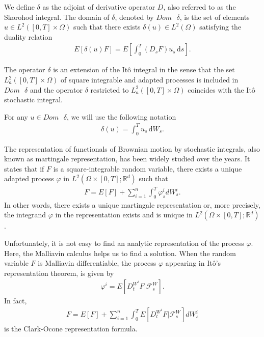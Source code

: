 \documentclass[a4paper,10pt]{article}
\renewcommand{\d}{\,\mathrm{d}}
\newcommand{\1}{\mathbf{1}}
\begin{document}
\medbreak 

We define $\delta$ as the adjoint of derivative operator $D$, also referred to as the Skorohod integral. The domain of $\delta$, denoted by $Dom\text{ }\delta$, is the set of elements $u \in L^{2}([0,T] \times \Omega)$ such that there exists $\delta(u) \in L^{2}(\Omega)$ satisfying the duality relation
\begin{eqnarray*}
E\left[\delta(u) F \right] = E\left[\int^{T}_{0} \left(D_{s} F\right) u_{s} \d s\right].
\end{eqnarray*}

The operator $\delta$ is an extension of the Itô integral in the sense that the set $L^{2}_{a}([0,T] \times \Omega)$ of square integrable and adapted processes is included in $Dom\text{ }\delta$ and the operator $\delta$ restricted to $L^{2}_{a}([0,T] \times \Omega)$ coincides with the Itô stochastic integral.

\medbreak

For any $u \in Dom\text{ }\delta$, we will use the following notation
\begin{eqnarray*}
\delta(u)=\int^{T}_{0}u_{s}\d W_{s}.
\end{eqnarray*}

\medbreak

The representation of functionals of Brownian motion by stochastic integrals, also known as martingale representation, has been widely studied over the years. It states that if $F$ is a square-integrable random variable, there exists a unique adapted process $\varphi$ in $L^{2}(\Omega \times \left[0,T\right]; \mathbb{R}^{d})$ such that
\begin{eqnarray*}
F=E\left[F\right] + \sum^{n}_{i=1}\int^{T}_{0} \varphi^{i}_{s} dW^{i}_{s}.
\end{eqnarray*}
In other words, there exists a unique martingale representation or, more precisely, the integrand $\varphi$ in the representation exists and is unique in $L^{2}(\Omega \times \left[0,T\right]; \mathbb{R}^{d})$.

\medbreak

Unfortunately, it is not easy to find an analytic representation of the process $\varphi$. Here, the Malliavin calculus helps us to find a solution. When the random variable $F$ is Malliavin differentiable, the process $\varphi$ appearing in It\^o's representation theorem, is given by
\begin{eqnarray*}
\varphi^{i}=E\left[D^{W^{i}}_{t}F|\mathcal{F}^{W}_{s}\right].
\end{eqnarray*}
In fact,
\begin{eqnarray}\label{clark-okone}
F=E\left[F\right] + \sum^{n}_{i=1}\int^{T}_{0} E\left[D^{W^{i}}_{t}F|\mathcal{F}^{W}_{s}\right] dW^{i}_{s}
\end{eqnarray}
is the Clark-Ocone representation formula. 
\end{document}
